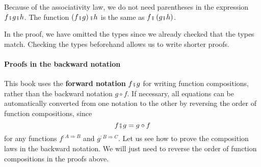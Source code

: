 Because of the associativity law, we do not need parentheses in the
expression $f\bef g\bef h$. The function $\left(f\bef g\right)\bef h$
is the same as $f\bef\left(g\bef h\right)$.

In the proof, we have omitted the types since we already checked that
the types match. Checking the types beforehand allows us to write
shorter proofs.

\paragraph{Proofs in the backward notation}

This book uses the \textbf{forward notation}
$f\bef g$ for writing function compositions, rather than the backward
notation $g\circ f$. If necessary, all equations can be automatically
converted from one notation to the other by reversing the order of
function compositions, since
\[
f\bef g=g\circ f
\]
for any functions $f^{:A\Rightarrow B}$ and $g^{:B\Rightarrow C}$.
Let us see how to prove the composition laws in the backward notation.
We will just need to reverse the order of function compositions in
the proofs above.

